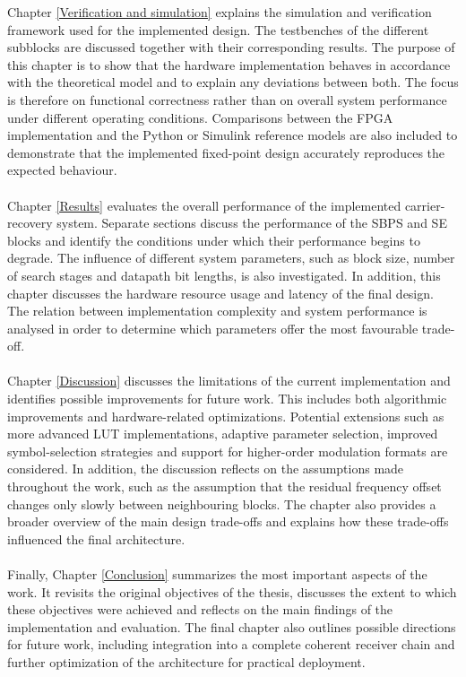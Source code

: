 Chapter \ref{Verification and simulation} explains the simulation and verification framework used for the implemented design. The testbenches of the different subblocks are discussed together with their corresponding results. The purpose of this chapter is to show that the hardware implementation behaves in accordance with the theoretical model and to explain any deviations between both. The focus is therefore on functional correctness rather than on overall system performance under different operating conditions. Comparisons between the \ac{FPGA} implementation and the Python or Simulink reference models are also included to demonstrate that the implemented fixed-point design accurately reproduces the expected behaviour.
\\\\
Chapter \ref{Results} evaluates the overall performance of the implemented carrier-recovery system. Separate sections discuss the performance of the \ac{SBPS} and \ac{SE} blocks and identify the conditions under which their performance begins to degrade. The influence of different system parameters, such as block size, number of search stages and datapath bit lengths, is also investigated. In addition, this chapter discusses the hardware resource usage and latency of the final design. The relation between implementation complexity and system performance is analysed in order to determine which parameters offer the most favourable trade-off.
\\\\
Chapter \ref{Discussion} discusses the limitations of the current implementation and identifies possible improvements for future work. This includes both algorithmic improvements and hardware-related optimizations. Potential extensions such as more advanced \ac{LUT} implementations, adaptive parameter selection, improved symbol-selection strategies and support for higher-order modulation formats are considered. In addition, the discussion reflects on the assumptions made throughout the work, such as the assumption that the residual frequency offset changes only slowly between neighbouring blocks. The chapter also provides a broader overview of the main design trade-offs and explains how these trade-offs influenced the final architecture.
\\\\
Finally, Chapter \ref{Conclusion} summarizes the most important aspects of the work. It revisits the original objectives of the thesis, discusses the extent to which these objectives were achieved and reflects on the main findings of the implementation and evaluation. The final chapter also outlines possible directions for future work, including integration into a complete coherent receiver chain and further optimization of the architecture for practical deployment.
